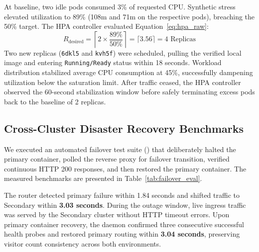 \documentclass[conference]{IEEEtran}
\begin{document}
At baseline, two idle pods consumed 3\% of requested CPU. Synthetic stress elevated utilization to 89\% (108m and 71m on the respective pods), breaching the 50\% target. The HPA controller evaluated Equation~\ref{eq:hpa_raw}:
\begin{equation*}
R_{\text{desired}} = \left\lceil 2 \times \frac{89\%}{50\%} \right\rceil = \lceil 3.56 \rceil = 4 \text{ Replicas}
\end{equation*}
Two new replicas (\texttt{6dkl5} and \texttt{kvh5f}) were scheduled, pulling the verified local image and entering \texttt{Running/Ready} status within 18 seconds. Workload distribution stabilized average CPU consumption at 45\%, successfully dampening utilization below the saturation limit. After traffic ceased, the HPA controller observed the 60-second stabilization window before safely terminating excess pods back to the baseline of 2 replicas.

\subsection{Cross-Cluster Disaster Recovery Benchmarks}
We executed an automated failover test suite () that deliberately halted the primary container, polled the reverse proxy for failover transition, verified continuous HTTP 200 responses, and then restored the primary container. The measured benchmarks are presented in Table~\ref{tab:failover_eval}.

\begin{table}[htbp]
\centering
\caption{Disaster Recovery Failover Latency Benchmarks}
\label{tab:failover_eval}
\end{table}

The router detected primary failure within 1.84 seconds and shifted traffic to Secondary within \textbf{3.03 seconds}. During the outage window, live ingress traffic was served by the Secondary cluster without HTTP timeout errors. Upon primary container recovery, the daemon confirmed three consecutive successful health probes and restored primary routing within \textbf{3.04 seconds}, preserving visitor count consistency across both environments.
\end{document}
